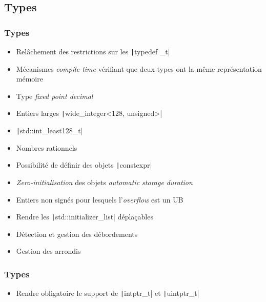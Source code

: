 \documentclass[C++.tex]{subfiles}
\begin{document}
\subsection*{Types}
\begin{frame}[fragile]
	\frametitle{Types}
	\begin{itemize}
		\item Relâchement des restrictions sur les \texttt|typedef _t|
		\item Mécanismes \textit{compile-time} vérifiant que deux types ont la même représentation mémoire
		\item Type \og{}\textit{fixed point decimal}\fg{}
		\item Entiers larges \texttt|wide_integer<128, unsigned>|
		\item \texttt|std::int_least128_t|
		\item Nombres rationnels
		\item Possibilité de définir des objets \texttt|constexpr|
		\item \textit{Zero-initialisation} des objets \textit{automatic storage duration}
		\item Entiers non signés pour lesquels l'\textit{overflow} est un UB
		\item Rendre les \texttt|std::initializer_list| déplaçables
		\item Détection et gestion des débordements
		\item Gestion des arrondis
	\end{itemize}

\end{frame}

\begin{frame}[fragile]
	\frametitle{Types}
	\begin{itemize}
		\item Rendre obligatoire le support de \texttt|intptr_t| et \texttt|uintptr_t|
	\end{itemize}

\end{frame}
\end{document}
